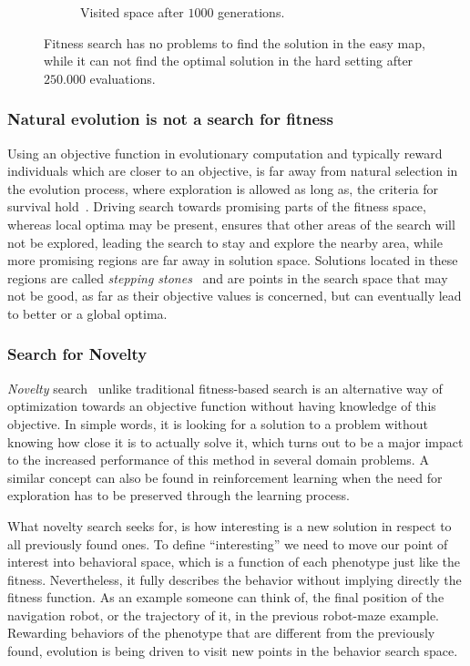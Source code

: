 \begin{figure}[t!]
\begin{subfigure}[b]{0.3\textwidth}
\caption{Visited space after $1000$ generations.}
\label{fig:mazeFitnessHard}
\end{subfigure}
\caption{Fitness search has no problems to find the solution in the easy map, while it can not find the optimal solution in the hard setting after $250.000$ evaluations.}
\label{fig:mazeFitness}
\end{figure}

\subsubsection*{Natural evolution is not a search for fitness}

Using an objective function in evolutionary computation and typically reward individuals which are closer to an objective, is far away from natural selection in the evolution process, where exploration is allowed as long as, the criteria for survival hold~\cite{lehman2010revising}. Driving search towards promising parts of the fitness space, whereas local optima may be present, ensures that other areas of the search will not be explored, leading the search to stay and explore the nearby area, while more promising regions are far away in solution space. Solutions located in these regions are called \emph{stepping stones}~\cite{lehman2008exploiting,lehman2011abandoning,lehman2010revising,risi2009novelty} and are points in the search space that may not be good, as far as their objective values is concerned, but can eventually lead to better or a global optima.


\subsubsection*{Search for Novelty}

\emph{Novelty} search~\cite{lehman2008exploiting,lehman2011abandoning,lehman2010revising, risi2009novelty} unlike traditional fitness-based search is an alternative way of optimization towards an objective function without having knowledge of this objective. In simple words, it is looking for a solution to a problem without knowing how close it is to actually solve it, which turns out to be a major impact to the increased performance of this method in several domain problems. A similar concept can also be found in reinforcement learning when the need for exploration has to be preserved through the learning process.

What novelty search seeks for, is how interesting is a new solution in respect to all previously found ones. To define ``interesting'' we need to move our point of interest into behavioral space, which is a function of each phenotype just like the fitness. Nevertheless, it fully describes the behavior without implying directly the fitness function. As an example someone can think of, the final position of the navigation robot, or the trajectory of it, in the previous robot-maze example. Rewarding behaviors of the phenotype that are different from the previously found, evolution is being driven to visit new points in the behavior search space.

